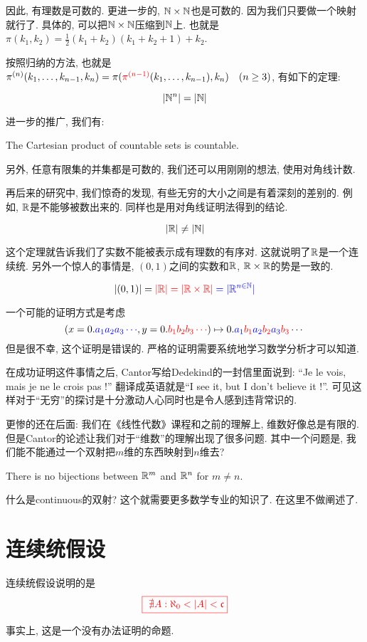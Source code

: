 因此, 有理数是可数的. 更进一步的, $\mathbb{N}\times \mathbb{N}$也是可数的. 因为我们只要做一个映射就行了. 具体的, 可以把$\mathbb{N} \times \mathbb{N} $压缩到$\mathbb{N}$上. 也就是$\pi(k_1, k_2) = \frac{1}{2} (k_1 + k_2)(k_1 + k_2 + 1) + k_2$. 

按照归纳的方法, 也就是$\pi^{(n)}(k_1, \ldots, k_{n-1}, k_n) = \pi (\textcolor{red}{\pi^{(n-1)}}(k_1, \ldots, k_{n-1}) , k_n)
\quad (n \ge 3)$, 有如下的定理: 
\begin{theorem}[$\N^{n}$ is Countable.]
  \[
    |\mathbb{N}^{n}| = |\mathbb{N}|
  \]
\end{theorem}

进一步的推广, 我们有:
\begin{theorem}
  The Cartesian product of  countable sets is countable.
\end{theorem}

另外, 任意有限集的并集都是可数的, 我们还可以用刚刚的想法, 使用对角线计数. 

再后来的研究中, 我们惊奇的发现, 有些无穷的大小之间是有着深刻的差别的. 例如, $\mathbb{R}$是不能够被数出来的. 同样也是用对角线证明法得到的结论. 

\begin{theorem}
  \[
    |\mathbb{R}| \neq |\mathbb{N}|
  \]
\end{theorem}

这个定理就告诉我们了实数不能被表示成有理数的有序对. 这就说明了$\mathbb{R}$是一个连续统. 另外一个惊人的事情是, $(0,1)$之间的实数和$\mathbb{R}$, $\mathbb{R}\times\mathbb{R}$的势是一致的. 
\begin{theorem}[$|\R|$ (Cantor 1877)]
    \[
      |(0,1)| = \textcolor{red}{|\mathbb{R}| = |\mathbb{R} \times \mathbb{R}|} \textcolor{blue}{\;= |\mathbb{R}^{n \in \mathbb{N}}|}
    \]
\end{theorem}
  
一个可能的证明方式是考虑
\[
    (x = 0.\textcolor{blue}{a_1 a_2 a_3 \cdots}, y = 0.\textcolor{red}{b_1 b_2 b_3 \cdots}) \mapsto 0.\textcolor{blue}{a_1}\textcolor{red}{b_1}\textcolor{blue}{a_2}\textcolor{red}{b_2}\textcolor{blue}{a_3}\textcolor{red}{b_3}\cdots
\]
但是很不幸, 这个证明是错误的. 严格的证明需要系统地学习数学分析才可以知道. 

在成功证明这件事情之后, Cantor写给Dedekind的一封信里面说到: ``Je le vois, mais je ne le crois pas !'' 翻译成英语就是``I see it, but I don’t believe it !''. 可见这样对于``无穷''的探讨是十分激动人心同时也是令人感到违背常识的. 

更惨的还在后面: 我们在《线性代数》课程和之前的理解上, 维数好像总是有限的. 但是Cantor的论述让我们对于``维数''的理解出现了很多问题. 其中一个问题是, 我们能不能通过一个双射把$m$维的东西映射到$n$维去? 

\begin{theorem}
    There is no  bijections between $\mathbb{R}^m$ and $\mathbb{R}^n$ for $m \neq n$.
\end{theorem}

什么是continuous的双射? 这个就需要更多数学专业的知识了. 在这里不做阐述了. 

\section{连续统假设}
 连续统假设说明的是
 \[
    \textcolor{red}{\fbox{\text{ $\nexists A: \aleph_{0} < |A| < \mathfrak{c}$}}}
  \]
  
  事实上, 这是一个没有办法证明的命题. 

